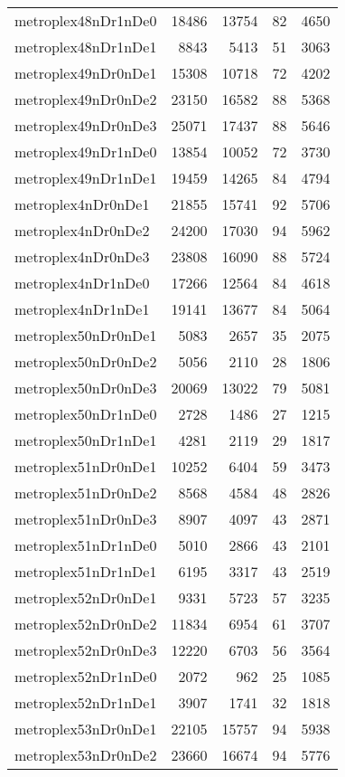 \begin{longtable}{lrrrr}
metroplex48nDr1nDe0 & 18486 & 13754 & 82 & 4650 \\
metroplex48nDr1nDe1 & 8843 & 5413 & 51 & 3063 \\
metroplex49nDr0nDe1 & 15308 & 10718 & 72 & 4202 \\
metroplex49nDr0nDe2 & 23150 & 16582 & 88 & 5368 \\
metroplex49nDr0nDe3 & 25071 & 17437 & 88 & 5646 \\
metroplex49nDr1nDe0 & 13854 & 10052 & 72 & 3730 \\
metroplex49nDr1nDe1 & 19459 & 14265 & 84 & 4794 \\
metroplex4nDr0nDe1 & 21855 & 15741 & 92 & 5706 \\
metroplex4nDr0nDe2 & 24200 & 17030 & 94 & 5962 \\
metroplex4nDr0nDe3 & 23808 & 16090 & 88 & 5724 \\
metroplex4nDr1nDe0 & 17266 & 12564 & 84 & 4618 \\
metroplex4nDr1nDe1 & 19141 & 13677 & 84 & 5064 \\
metroplex50nDr0nDe1 & 5083 & 2657 & 35 & 2075 \\
metroplex50nDr0nDe2 & 5056 & 2110 & 28 & 1806 \\
metroplex50nDr0nDe3 & 20069 & 13022 & 79 & 5081 \\
metroplex50nDr1nDe0 & 2728 & 1486 & 27 & 1215 \\
metroplex50nDr1nDe1 & 4281 & 2119 & 29 & 1817 \\
metroplex51nDr0nDe1 & 10252 & 6404 & 59 & 3473 \\
metroplex51nDr0nDe2 & 8568 & 4584 & 48 & 2826 \\
metroplex51nDr0nDe3 & 8907 & 4097 & 43 & 2871 \\
metroplex51nDr1nDe0 & 5010 & 2866 & 43 & 2101 \\
metroplex51nDr1nDe1 & 6195 & 3317 & 43 & 2519 \\
metroplex52nDr0nDe1 & 9331 & 5723 & 57 & 3235 \\
metroplex52nDr0nDe2 & 11834 & 6954 & 61 & 3707 \\
metroplex52nDr0nDe3 & 12220 & 6703 & 56 & 3564 \\
metroplex52nDr1nDe0 & 2072 & 962 & 25 & 1085 \\
metroplex52nDr1nDe1 & 3907 & 1741 & 32 & 1818 \\
metroplex53nDr0nDe1 & 22105 & 15757 & 94 & 5938 \\
metroplex53nDr0nDe2 & 23660 & 16674 & 94 & 5776 \\

\end{longtable}
